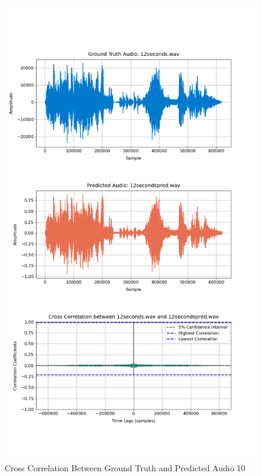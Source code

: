 \documentclass{ioereport}
\begin{document}
    \begin{figure}[H]
        \centering
        \includegraphics[width=\linewidth]{assets/crosscorrelation/cross_correlation_12seconds_12secondspred.png}
        \caption{Cross Correlation Between Ground Truth and Predicted Audio 10}
        \label{fig:cross-correlation-10}
    \end{figure}
\end{document}
